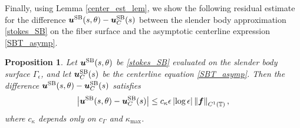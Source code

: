 \documentclass[11pt]{article}
\numberwithin{equation}{section}
\newcommand{\T}{\mathbb{T}}
\newcommand{\bu}{\bm{u}}
\newcommand{\SB}{{\rm SB}}
\newcommand{\abs}[1]{\left\lvert #1 \right\rvert}
\newcommand{\norm}[1]{\left\lVert #1 \right\rVert}
\newtheorem{proposition}[theorem]{Proposition}
\theoremstyle{definition}
\begin{document}
Finally, using Lemma \ref{center_est_lem}, we show the following residual estimate for the difference $\bu^{\SB}(s,\theta)-\bu^{\SB}_C(s)$ between the slender body approximation \eqref{stokes_SB} on the fiber surface and the asymptotic centerline expression \eqref{SBT_asymp}.
\begin{proposition}\label{centerline_prop}
Let $\bu^{\SB}(s,\theta)$ be \eqref{stokes_SB} evaluated on the slender body surface $\Gamma_\epsilon$, and let $\bu^{\SB}_C(s)$ be the centerline equation \eqref{SBT_asymp}. Then the difference $\bu^{\SB}(s,\theta)-\bu^{\SB}_C(s)$ satisfies
\begin{equation}\label{centerline_resid}
\abs{\bu^{\SB}(s,\theta)-\bu^{\SB}_C(s)} \le c_\kappa\epsilon\abs{\log\epsilon}\norm{\bm{f}}_{C^1(\T)},
\end{equation}
where $c_\kappa$ depends only on $c_\Gamma$ and $\kappa_{\max}$.
\end{proposition}
\end{document}
